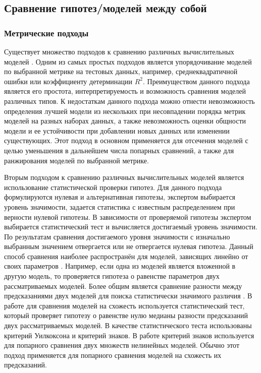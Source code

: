 \subsection{Сравнение гипотез/моделей между собой} \label{sect1_2_3}

\subsubsection{Метрические подходы}\label{sect1_2_3_1}
Существует множество подходов к сравнению различных вычислительных моделей \cite{tirikov2021methods}. Одним из самых 
простых подходов \cite{pham2019new, pham2007system} является упорядочивание моделей по выбранной метрике на тестовых 
данных, например, среднеквадратичной ошибки или коэффициенту детерминации $R^2$. Преимуществом данного подхода 
является его простота, интерпретируемость и возможность сравнения моделей различных типов. К недостаткам данного
 подхода можно отнести невозможность определения лучшей модели из нескольких при несовпадении порядка метрик моделей 
 на разных наборах данных, а также невозможность оценки общности модели и ее устойчивости при добавлении новых данных 
 или изменении существующих. Этот подход в основном применяется для отсечения моделей с целью уменьшения в дальнейшем 
 числа попарных сравнений, а также для ранжирования моделей по выбранной метрике.

Вторым подходом к сравнению различных вычислительных моделей является использование статистической проверки гипотез. 
Для данного подхода формулируются нулевая и альтернативная гипотезы, экспертом выбирается уровень значимости, задается 
статистика с известным распределением при верности нулевой гипотезы. В зависимости от проверяемой гипотезы экспертом 
выбирается статистический тест и вычисляется достигаемый уровень значимости. По результатам сравнения достигаемого 
уровня значимости с изначально выбранным значением отвергается или не отвергается нулевая гипотеза. Данный способ 
сравнения наиболее распространён для моделей, зависящих линейно от своих параметров \cite{pham2007system}. Например, 
если одна из моделей является вложенной в другую модель, то проверяется гипотеза о равенстве параметров двух 
рассматриваемых моделей. Более общим является сравнение разности между предсказаниями двух моделей для поиска 
статистически значимого различия \cite{rencher2008linear}. В работе \cite{mahmoudi2018testing} для сравнения моделей 
на схожесть используется статистический тест, который проверяет гипотезу о равенстве нулю медианы разности предсказаний 
двух рассматриваемых моделей. В качестве статистического теста использованы критерий Уилкоксона и критерий знаков. 
В работе \cite{tirikov2021methods} критерий знаков используется для попарного сравнения двух множеств нелинейных моделей. 
Обычно этот подход применяется для попарного сравнения моделей на схожесть их предсказаний.

